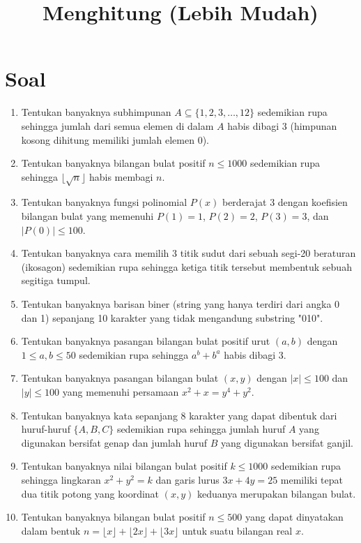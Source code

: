 \documentclass[12pt]{scrartcl}
\begin{document}
\renewcommand*\contentsname{Daftar Isi}
\tableofcontents

\newpage

\title{Menghitung (Lebih Mudah)}
\section*{Soal}
\begin{enumerate}

\item Tentukan banyaknya subhimpunan $A \subseteq \{1, 2, 3, \dots, 12\}$ sedemikian rupa sehingga jumlah dari semua elemen di dalam $A$ habis dibagi 3 (himpunan kosong dihitung memiliki jumlah elemen 0).

\item Tentukan banyaknya bilangan bulat positif $n \le 1000$ sedemikian rupa sehingga $\lfloor \sqrt{n} \rfloor$ habis membagi $n$.

\item Tentukan banyaknya fungsi polinomial $P(x)$ berderajat 3 dengan koefisien bilangan bulat yang memenuhi $P(1) = 1$, $P(2) = 2$, $P(3) = 3$, dan $|P(0)| \le 100$.

\item Tentukan banyaknya cara memilih 3 titik sudut dari sebuah segi-20 beraturan (ikosagon) sedemikian rupa sehingga ketiga titik tersebut membentuk sebuah segitiga tumpul.

\item Tentukan banyaknya barisan biner (string yang hanya terdiri dari angka 0 dan 1) sepanjang 10 karakter yang tidak mengandung substring "010".

\item Tentukan banyaknya pasangan bilangan bulat positif urut $(a,b)$ dengan $1 \le a, b \le 50$ sedemikian rupa sehingga $a^b + b^a$ habis dibagi 3.

\item Tentukan banyaknya pasangan bilangan bulat $(x,y)$ dengan $|x| \le 100$ dan $|y| \le 100$ yang memenuhi persamaan $x^2 + x = y^4 + y^2$.

\item Tentukan banyaknya kata sepanjang 8 karakter yang dapat dibentuk dari huruf-huruf $\{A, B, C\}$ sedemikian rupa sehingga jumlah huruf $A$ yang digunakan bersifat genap dan jumlah huruf $B$ yang digunakan bersifat ganjil.

\item Tentukan banyaknya nilai bilangan bulat positif $k \le 1000$ sedemikian rupa sehingga lingkaran $x^2 + y^2 = k$ dan garis lurus $3x + 4y = 25$ memiliki tepat dua titik potong yang koordinat $(x,y)$ keduanya merupakan bilangan bulat.

\item Tentukan banyaknya bilangan bulat positif $n \le 500$ yang dapat dinyatakan dalam bentuk $n = \lfloor x \rfloor + \lfloor 2x \rfloor + \lfloor 3x \rfloor$ untuk suatu bilangan real $x$.

\end{enumerate}
\end{document}

